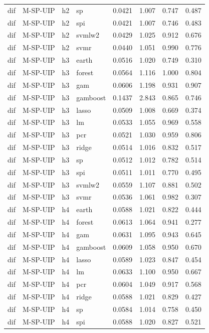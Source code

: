 \begin{ThreePartTable}
\begin{longtable}[t]{llclcccc}
dif & M-SP-UIP & h2 & sp & 0.0421 & 1.007 & 0.747 & 0.487\\
dif & M-SP-UIP & h2 & spi & 0.0421 & 1.007 & 0.746 & 0.483\\
dif & M-SP-UIP & h2 & svmlw2 & 0.0429 & 1.025 & 0.912 & 0.676\\
dif & M-SP-UIP & h2 & svmr & 0.0440 & 1.051 & 0.990 & 0.776\\
\addlinespace
dif & M-SP-UIP & h3 & earth & 0.0516 & 1.020 & 0.749 & 0.310\\
dif & M-SP-UIP & h3 & forest & 0.0564 & 1.116 & 1.000 & 0.804\\
dif & M-SP-UIP & h3 & gam & 0.0606 & 1.198 & 0.931 & 0.907\\
dif & M-SP-UIP & h3 & gamboost & 0.1437 & 2.843 & 0.865 & 0.746\\
dif & M-SP-UIP & h3 & lasso & 0.0509 & 1.008 & 0.669 & 0.374\\
dif & M-SP-UIP & h3 & lm & 0.0533 & 1.055 & 0.969 & 0.558\\
dif & M-SP-UIP & h3 & pcr & 0.0521 & 1.030 & 0.959 & 0.806\\
dif & M-SP-UIP & h3 & ridge & 0.0514 & 1.016 & 0.832 & 0.517\\
dif & M-SP-UIP & h3 & sp & 0.0512 & 1.012 & 0.782 & 0.514\\
dif & M-SP-UIP & h3 & spi & 0.0511 & 1.011 & 0.770 & 0.495\\
dif & M-SP-UIP & h3 & svmlw2 & 0.0559 & 1.107 & 0.881 & 0.502\\
dif & M-SP-UIP & h3 & svmr & 0.0536 & 1.061 & 0.982 & 0.307\\
\addlinespace
dif & M-SP-UIP & h4 & earth & 0.0588 & 1.021 & 0.822 & 0.444\\
dif & M-SP-UIP & h4 & forest & 0.0613 & 1.064 & 0.941 & 0.277\\
dif & M-SP-UIP & h4 & gam & 0.0631 & 1.095 & 0.943 & 0.645\\
dif & M-SP-UIP & h4 & gamboost & 0.0609 & 1.058 & 0.950 & 0.670\\
dif & M-SP-UIP & h4 & lasso & 0.0589 & 1.023 & 0.847 & 0.454\\
dif & M-SP-UIP & h4 & lm & 0.0633 & 1.100 & 0.950 & 0.667\\
dif & M-SP-UIP & h4 & pcr & 0.0604 & 1.049 & 0.917 & 0.568\\
dif & M-SP-UIP & h4 & ridge & 0.0588 & 1.021 & 0.829 & 0.427\\
dif & M-SP-UIP & h4 & sp & 0.0584 & 1.014 & 0.758 & 0.450\\
dif & M-SP-UIP & h4 & spi & 0.0588 & 1.020 & 0.827 & 0.521\\

\end{longtable}
\end{ThreePartTable}
